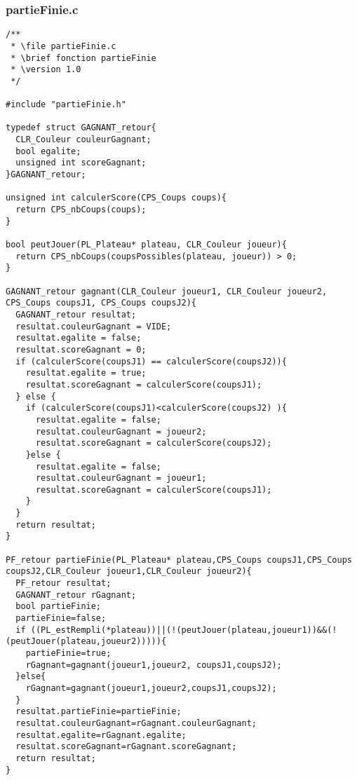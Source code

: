 \subsubsection{partieFinie.c}
\begin{lstlisting}
/**
 * \file partieFinie.c
 * \brief fonction partieFinie
 * \version 1.0
 */

#include "partieFinie.h"

typedef struct GAGNANT_retour{
  CLR_Couleur couleurGagnant;
  bool egalite;
  unsigned int scoreGagnant;
}GAGNANT_retour;

unsigned int calculerScore(CPS_Coups coups){
  return CPS_nbCoups(coups);
}

bool peutJouer(PL_Plateau* plateau, CLR_Couleur joueur){
  return CPS_nbCoups(coupsPossibles(plateau, joueur)) > 0;
}

GAGNANT_retour gagnant(CLR_Couleur joueur1, CLR_Couleur joueur2, CPS_Coups coupsJ1, CPS_Coups coupsJ2){
  GAGNANT_retour resultat;
  resultat.couleurGagnant = VIDE;
  resultat.egalite = false;
  resultat.scoreGagnant = 0;
  if (calculerScore(coupsJ1) == calculerScore(coupsJ2)){
    resultat.egalite = true;
    resultat.scoreGagnant = calculerScore(coupsJ1);
  } else {
    if (calculerScore(coupsJ1)<calculerScore(coupsJ2) ){
      resultat.egalite = false;
      resultat.couleurGagnant = joueur2;
      resultat.scoreGagnant = calculerScore(coupsJ2);
    }else {
      resultat.egalite = false;
      resultat.couleurGagnant = joueur1;
      resultat.scoreGagnant = calculerScore(coupsJ1);      
    }
  }    
  return resultat;  
}

PF_retour partieFinie(PL_Plateau* plateau,CPS_Coups coupsJ1,CPS_Coups coupsJ2,CLR_Couleur joueur1,CLR_Couleur joueur2){
  PF_retour resultat;
  GAGNANT_retour rGagnant;
  bool partieFinie;
  partieFinie=false;
  if ((PL_estRempli(*plateau))||(!(peutJouer(plateau,joueur1))&&(!(peutJouer(plateau,joueur2))))){
    partieFinie=true;
    rGagnant=gagnant(joueur1,joueur2, coupsJ1,coupsJ2);
  }else{
    rGagnant=gagnant(joueur1,joueur2,coupsJ1,coupsJ2);
  }
  resultat.partieFinie=partieFinie;
  resultat.couleurGagnant=rGagnant.couleurGagnant;
  resultat.egalite=rGagnant.egalite;
  resultat.scoreGagnant=rGagnant.scoreGagnant;
  return resultat;
}
\end{lstlisting}

